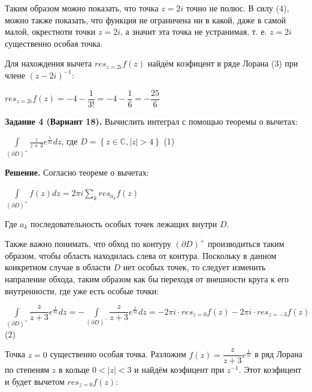 \documentclass[a4paper, 12pt]{article}
\begin{document}
	\quad Таким образом можно показать, что точка $z = 2i$ точно не полюс. В силу (4), можно также показать, что функция не ограничена ни в какой, даже в самой малой, окрестноти точки $z = 2i$, а значит эта точка не устранимая, т. е. $z = 2i$ существенно особая точка. 
	
	\quad Для нахождения вычета $res_{z=2i}f(z)$ найдём коэфицент в ряде Лорана (3) при члене $(z -2i)^{-1}$:
	
	\begin{center}
		$ res_{z=2i} f(z) = -4 - \dfrac{1}{3!} = -4 - \dfrac{1}{6} = -\dfrac{25}{6} $
	\end{center}
	
	\quad \textbf{Задание 4 (Вариант 18). } Вычислить интеграл с помощью теоремы о вычетах:
	
	\begin{center}
		$\displaystyle\int\limits_{(\partial D)^{+}} \frac{z}{z+3} e^{\frac{1}{3z}} dz$, где $D = \left\{ z \in \mathbb C, |z| > 4 \right\}$ (1)
	\end{center} 
	
	\quad \textbf{Решение.} Согласно теореме о вычетах: 
	
	\begin{center}
		$\displaystyle \int\limits_{(\partial D)^+} f(z) dz  = 2 \pi  i\sum\limits_{k} res_{a_k} f(z)$ 
	\end{center}
	
	\quad Где $a_k$ последовательность особых точек лежащих внутри $ D$.
	
	\quad Также важно понимать, что обход по контуру $(\partial D)^+$ производиться таким образом, чтобы область находилась слева от контура. Поскольку в данном конкретном случае в области $D$ нет особых точек, то следует изменить напраление обхода, таким образом как бы переходя от внешности круга к его внутренности, где уже есть особые точки: 
	
	\begin{center}
		$\displaystyle \int\limits_{(\partial D)^+} \dfrac{z}{z+3} e^{\frac{1}{3z}} dz= - \displaystyle \int\limits_{(\partial D)^-} \dfrac{z}{z+3} e^{\frac{1}{3z}}dz = - 2\pi i \cdot res_{z=0} f(z) - 2\pi i \cdot  res_{z=-3} f(z) $ (2)
	\end{center} 
	
	\quad  Точка $z = 0$ существенно особая точка. Разложим $f(z) = \dfrac{z}{z+3} e^{\frac{1}{3z}}$ в ряд Лорана по степеням $z$ в кольце $0 < |z| < 3$ и найдём коэфицент при $z^{-1}$. Этот коэфицент и будет вычетом $res_{z=0} f(z)$:
	
\end{document}
